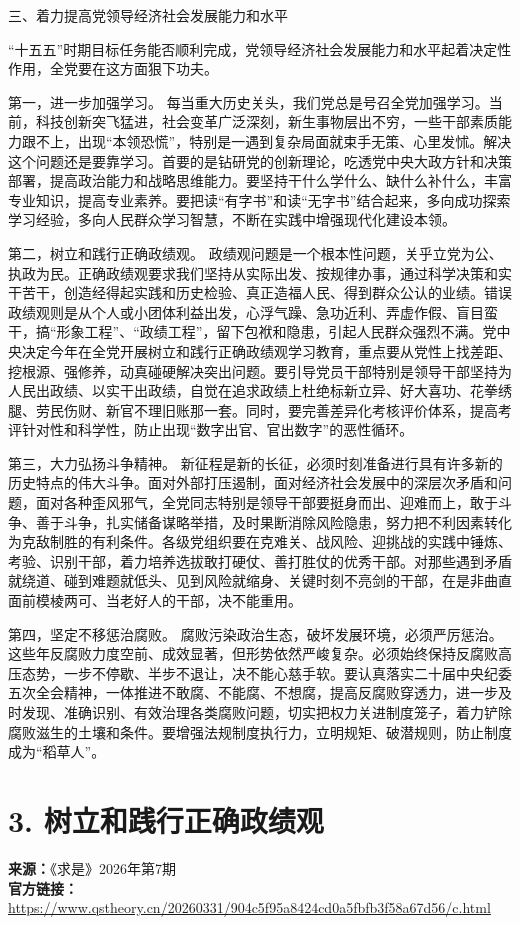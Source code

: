 \documentclass[UTF8,zihao=-4]{ctexart}
\begin{document}
三、着力提高党领导经济社会发展能力和水平

“十五五”时期目标任务能否顺利完成，党领导经济社会发展能力和水平起着决定性作用，全党要在这方面狠下功夫。

第一，进一步加强学习。 每当重大历史关头，我们党总是号召全党加强学习。当前，科技创新突飞猛进，社会变革广泛深刻，新生事物层出不穷，一些干部素质能力跟不上，出现“本领恐慌”，特别是一遇到复杂局面就束手无策、心里发怵。解决这个问题还是要靠学习。首要的是钻研党的创新理论，吃透党中央大政方针和决策部署，提高政治能力和战略思维能力。要坚持干什么学什么、缺什么补什么，丰富专业知识，提高专业素养。要把读“有字书”和读“无字书”结合起来，多向成功探索学习经验，多向人民群众学习智慧，不断在实践中增强现代化建设本领。

第二，树立和践行正确政绩观。 政绩观问题是一个根本性问题，关乎立党为公、执政为民。正确政绩观要求我们坚持从实际出发、按规律办事，通过科学决策和实干苦干，创造经得起实践和历史检验、真正造福人民、得到群众公认的业绩。错误政绩观则是从个人或小团体利益出发，心浮气躁、急功近利、弄虚作假、盲目蛮干，搞“形象工程”、“政绩工程”，留下包袱和隐患，引起人民群众强烈不满。党中央决定今年在全党开展树立和践行正确政绩观学习教育，重点要从党性上找差距、挖根源、强修养，动真碰硬解决突出问题。要引导党员干部特别是领导干部坚持为人民出政绩、以实干出政绩，自觉在追求政绩上杜绝标新立异、好大喜功、花拳绣腿、劳民伤财、新官不理旧账那一套。同时，要完善差异化考核评价体系，提高考评针对性和科学性，防止出现“数字出官、官出数字”的恶性循环。

第三，大力弘扬斗争精神。 新征程是新的长征，必须时刻准备进行具有许多新的历史特点的伟大斗争。面对外部打压遏制，面对经济社会发展中的深层次矛盾和问题，面对各种歪风邪气，全党同志特别是领导干部要挺身而出、迎难而上，敢于斗争、善于斗争，扎实储备谋略举措，及时果断消除风险隐患，努力把不利因素转化为克敌制胜的有利条件。各级党组织要在克难关、战风险、迎挑战的实践中锤炼、考验、识别干部，着力培养选拔敢打硬仗、善打胜仗的优秀干部。对那些遇到矛盾就绕道、碰到难题就低头、见到风险就缩身、关键时刻不亮剑的干部，在是非曲直面前模棱两可、当老好人的干部，决不能重用。

第四，坚定不移惩治腐败。 腐败污染政治生态，破坏发展环境，必须严厉惩治。这些年反腐败力度空前、成效显著，但形势依然严峻复杂。必须始终保持反腐败高压态势，一步不停歇、半步不退让，决不能心慈手软。要认真落实二十届中央纪委五次全会精神，一体推进不敢腐、不能腐、不想腐，提高反腐败穿透力，进一步及时发现、准确识别、有效治理各类腐败问题，切实把权力关进制度笼子，着力铲除腐败滋生的土壤和条件。要增强法规制度执行力，立明规矩、破潜规则，防止制度成为“稻草人”。

\clearpage
\section*{3. 树立和践行正确政绩观}
\noindent\textbf{来源：}《求是》2026年第7期\\
\noindent\textbf{官方链接：}
\noindent\url{https://www.qstheory.cn/20260331/904c5f95a8424cd0a5fbfb3f58a67d56/c.html}
\end{document}
